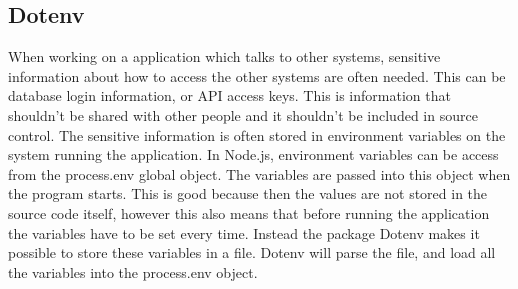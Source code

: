 \subsection{Dotenv}
When working on a application which talks to other systems, sensitive information about how to access the other systems are often needed. This can be database login information, or API access keys. This is information that shouldn't be shared with other people and it shouldn't be included in source control. The sensitive information is often stored in environment variables on the system running the application. In Node.js, environment variables can be access from the process.env global object. The variables are passed into this object when the program starts. This is good because then the values are not stored in the source code itself, however this also means that before running the application the variables have to be set every time. Instead the package Dotenv\cite{dotenv} makes it possible to store these variables in a file. Dotenv will parse the file, and load all the variables into the process.env object.
